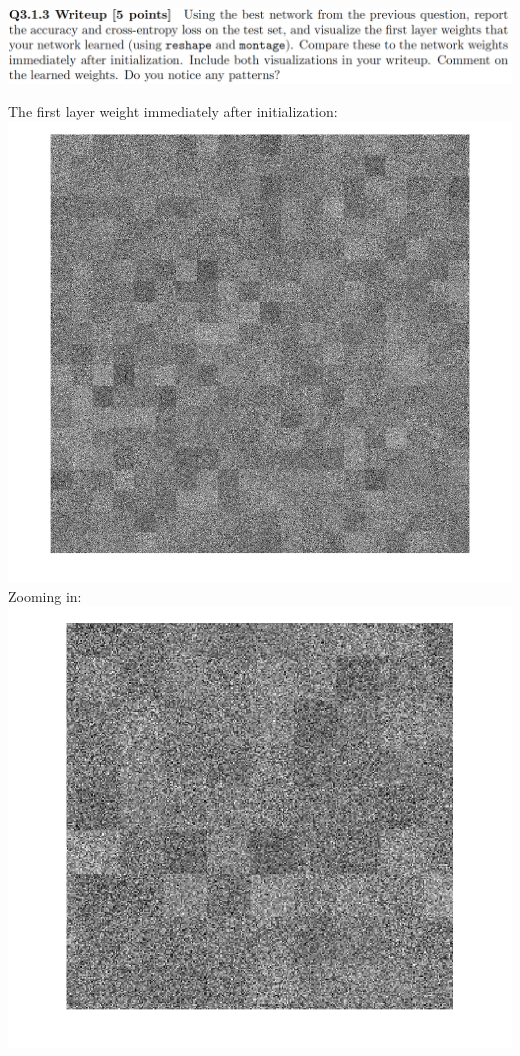 \documentclass[12pt,letterpaper,boxed]{hmcpset}
\begin{document}
\begin{problem}[]
\includegraphics[width=\textwidth]{3_1_3.png}
\end{problem}

\begin{solution}
The first layer weight immediately after initialization:\\
\includegraphics[width=\textwidth]{3_1_3_1.png}\\
Zooming in:\\
\includegraphics[width=\textwidth]{3_1_3_211.png}\\

\end{solution}
\end{document}
